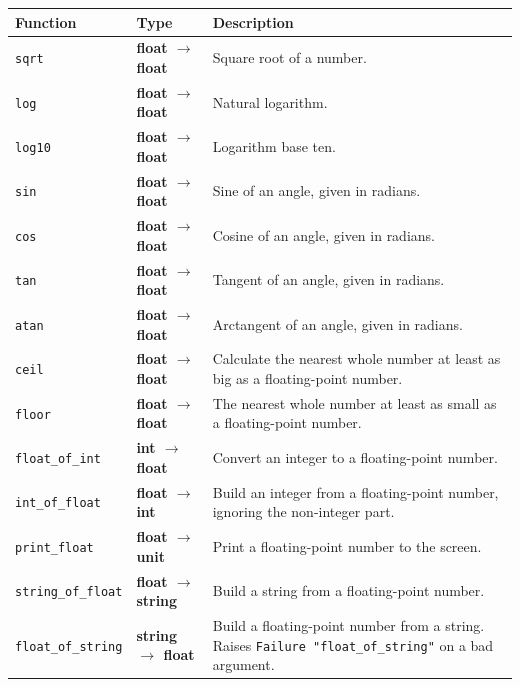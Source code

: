 \documentclass[]{book}
\renewcommand{\arraystretch}{1.2}
\newcommand{\smspace}{\vspace{4mm}}
\begin{document}
\smspace
\bgroup
\def\arraystretch{1.2}
\noindent\begin{tabular}{@{}llp{}@{}} \toprule
Function & Type & Description\\ \midrule
\index{sqrt@\texttt{sqrt}}\verb!sqrt! & \textrm{\textbf{float $\rightarrow$ float}} & Square root of a number.\\
\index{log@\texttt{log}}\verb!log! & \textrm{\textbf{float $\rightarrow$ float}} & Natural logarithm.\\
\index{log10@\texttt{log10}}\verb!log10! & \textrm{\textbf{float $\rightarrow$ float}} & Logarithm base ten.\\
\index{sin@\texttt{sin}}\verb!sin! & \textrm{\textbf{float $\rightarrow$ float}} & Sine of an angle, given in radians.\\
\index{cos@\texttt{cos}}\verb!cos! & \textrm{\textbf{float $\rightarrow$ float}} & Cosine of an angle, given in radians.\\
\index{tan@\texttt{tan}}\verb!tan! & \textrm{\textbf{float $\rightarrow$ float}} & Tangent of an angle, given in radians.\\
\index{atan@\texttt{atan}}\verb!atan! & \textrm{\textbf{float $\rightarrow$ float}} & Arctangent of an angle, given in radians.\\
\index{ceil@\texttt{ceil}}\verb!ceil! & \textrm{\textbf{float $\rightarrow$ float}} & Calculate the nearest whole number at least as big as a floating-point number.\\
\index{floor@\texttt{floor}}\verb!floor! & \textrm{\textbf{float $\rightarrow$ float}} & The nearest whole number at least as small as a floating-point number.\\
\index{float\_of\_int@\texttt{float\_of\_int}}\verb!float_of_int! & \textrm{\textbf{int $\rightarrow$ float}}& Convert an integer to a floating-point number.\\
\index{int\_of\_float@\texttt{int\_of\_float}}\verb!int_of_float!& \textrm{\textbf{float $\rightarrow$ int}}& Build an integer from a floating-point number, ignoring the non-integer part.\\
\index{print\_float@\texttt{print\_float}}\verb!print_float! & \textrm{\textbf{float $\rightarrow$ unit}} & Print a floating-point number to the screen.\\
\index{string\_of\_float@\texttt{string\_of\_float}}\verb!string_of_float! & \textrm{\textbf{float $\rightarrow$ string}} & Build a string from a floating-point number.\\
\index{float\_of\_string@\texttt{float\_of\_string}}\verb!float_of_string! & \textrm{\textbf{string $\rightarrow$ float}} & Build a floating-point number from a string. Raises \texttt{Failure\! "float\_of\_string"} on a bad argument. \\ \bottomrule
\end{tabular}
\egroup
\smspace
\end{document}
